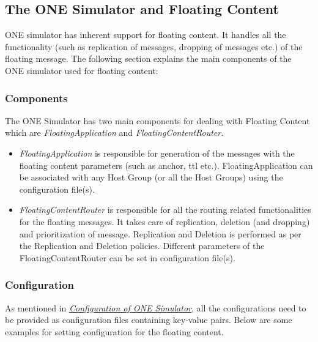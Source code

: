 \subsection{The ONE Simulator and Floating Content}
ONE simulator has inherent support for floating content. It handles all the functionality (such as replication of messages, dropping of messages etc.) of the floating message. The following section explains the main components of the ONE simulator used for floating content:

\subsubsection{Components}
The ONE Simulator has two main components for dealing with Floating Content which are \textit{FloatingApplication} and \textit{FloatingContentRouter}.

\begin{itemize}
\item \textit{FloatingApplication} is responsible for generation of the messages with the floating content parameters (such as anchor, ttl etc.). FloatingApplication can be associated with any Host Group (or all the Host Groups) using the configuration file(s).
\item \textit{FloatingContentRouter} is responsible for all the routing related functionalities for the floating messages. It takes care of replication, deletion (and dropping) and prioritization of message. Replication and Deletion is performed as per the Replication and Deletion policies. Different parameters of the FloatingContentRouter can be set in configuration file(s).
\end{itemize}


\subsubsection{Configuration}
As mentioned in \hyperref[one:configuration]{\emph{Configuration of ONE Simulator}}, all the configurations need to be provided as configuration files containing key-value pairs. Below are some examples for setting configuration for the floating content.

